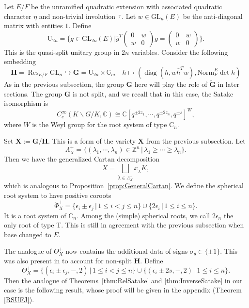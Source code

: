 \documentclass{amsart}
\theoremstyle{definition}
\theoremstyle{remark}
\newcommand{\1}{\mathbf{1}}
\newcommand{\C}{\mathbb{C}}
\newcommand{\G}{\mathbf{G}}
\newcommand{\GL}{\mathrm{GL}}
\newcommand{\mb}[1]{\mathbf{#1}}
\newcommand{\U}{\mathrm{U}}
\newcommand{\Z}{\mathbb{Z}}
\DeclareMathOperator{\diag}{diag}
\DeclareMathOperator{\Res}{Res}
\theoremstyle{definition}
\renewcommand{\G}{\mathbb{G}}
\newcommand{\bG}{\mathbf{G}}
\begin{document}
Let $E/F$ be the unramified quadratic extension with associated quadratic character $\eta$ and non-trivial involution $\bar{\cdot}$. Let $w\in \GL_n(E)$ be the anti-diagonal matrix with entities $1$. Define
\[
    \U_{2n}=\{g\in \GL_{2n}(E)| \bar{g}^T\begin{pmatrix}0 & w \\ w & 0\end{pmatrix}g= \begin{pmatrix}0 & w \\ w & 0\end{pmatrix}\}.
\]
This is the quasi-split unitary group in $2n$ variables. Consider the following embedding
\[
    \mb{H}=\Res_{E/F}\GL_n\hookrightarrow\bG =\U_{2n}\times \G_m \quad h\mapsto (\diag(h, w \bar{h}^{T}w),\mathrm{Norm}_F^E\det h)
\]
As in the previous subsection, the group $\bG$ here will play the role of $\widetilde{\bG}$ in later sections. The group $\mb{G}$ is not split, and we recall that in this case, the Satake isomorphism is
\[
    C_c^\infty(K\backslash G/K,\C)\cong \C[q^{\pm 2 z_1},\cdots, q^{\pm 2z_n},q^{\pm s}]^W,
\]
where $W$ is the Weyl group for the root system of type $\mathrm{C}_n$.

Set $\mb{X}:=\bG/\mb{H}$. This is a form of the variety $\mb{X}$ from the previous subsection. Let
\[
    \Lambda_X^+=\{(\lambda_1,\cdots,\lambda_n)\in\Z^n\,|\,\lambda_1\geq\cdots\geq\lambda_n\}.
\]
Then we have the generalized Cartan decomposition
\[
    X=\bigsqcup_{\check{\lambda}\in\Lambda_X^+}x_{\check{\lambda}}K,
\]
which is analogous to Proposition~\ref{prop:GeneralCartan}. We define the spherical root system to have positive coroots
\[
  \check{\Phi}_X^+=\{\epsilon_i\pm\epsilon_j\,|\,1\leq i<j\leq n\}\cup\{2\epsilon_i\,|\,1\leq i\leq n\}.
\]
It is a root system of $\mathrm{C}_n$. Among the (simple) spherical roots, we call $2\epsilon_n$ the only root of type T. This is still in agreement with the previous subsection when base changed to $E$.

The analogue of $\Theta_X^+$ now contains the additional data of signs $\sigma_{\check{\theta}}\in\{\pm 1\}$. This was also present in \cite{SakSpherical} to account for non-split $\mb{H}$. Define
\[
  \Theta_X^+=\{(\epsilon_i\pm\epsilon_j,-,2)\,|\,1\leq i<j\leq n\}\cup\{(\epsilon_i\pm 2s,-,2)\,|\,1\leq i\leq n\}.
\]
Then the analogue of Theorems~\ref{thm:RelSatake} and \ref{thm:InverseSatake} in our case is the following result, whose proof will be given in the appendix (Theorem \ref{RSUFJ}). 
\end{document}
